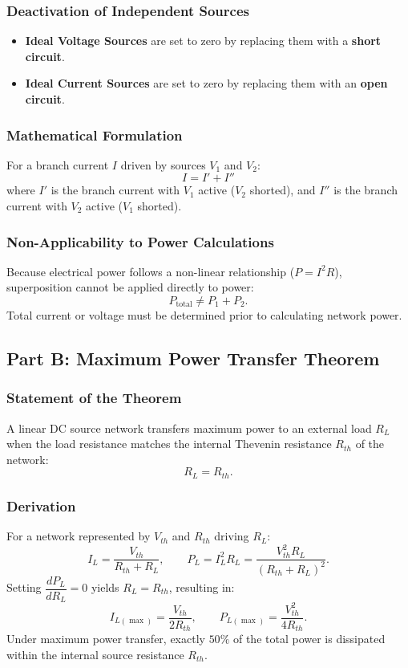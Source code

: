 \subsubsection{Deactivation of Independent Sources}
\begin{itemize}
	\item \textbf{Ideal Voltage Sources} are set to zero by replacing them with a \textbf{short circuit}.
	\item \textbf{Ideal Current Sources} are set to zero by replacing them with an \textbf{open circuit}.
\end{itemize}

\subsubsection{Mathematical Formulation}
For a branch current $I$ driven by sources $V_1$ and $V_2$:
\[
I = I' + I''
\]
where $I'$ is the branch current with $V_1$ active ($V_2$ shorted), and $I''$ is the branch current with $V_2$ active ($V_1$ shorted).

\subsubsection{Non-Applicability to Power Calculations}
Because electrical power follows a non-linear relationship ($P = I^2 R$), superposition cannot be applied directly to power:
\[
P_{\text{total}} \neq P_1 + P_2.
\]
Total current or voltage must be determined prior to calculating network power.

\subsection{Part B: Maximum Power Transfer Theorem}

\subsubsection{Statement of the Theorem}
A linear DC source network transfers maximum power to an external load $R_L$ when the load resistance matches the internal Thevenin resistance $R_{th}$ of the network:
\[
R_L = R_{th}.
\]

\subsubsection{Derivation}
For a network represented by $V_{th}$ and $R_{th}$ driving $R_L$:
\[
I_L = \frac{V_{th}}{R_{th}+R_L}, \qquad P_L = I_L^2 R_L = \frac{V_{th}^2 R_L}{(R_{th}+R_L)^2}.
\]
Setting $\dfrac{dP_L}{dR_L}=0$ yields $R_L = R_{th}$, resulting in:
\[
I_{L(\max)} = \frac{V_{th}}{2R_{th}}, \qquad P_{L(\max)} = \frac{V_{th}^2}{4R_{th}}.
\]
Under maximum power transfer, exactly $50\%$ of the total power is dissipated within the internal source resistance $R_{th}$.

